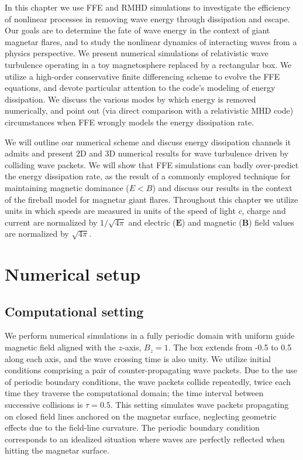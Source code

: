 In this chapter we use FFE and RMHD simulations to investigate the efficiency of nonlinear processes in removing wave energy through dissipation and escape.
Our goals are to determine the fate of wave energy in the context of giant magnetar flares, and to study the nonlinear dynamics of interacting \alfven waves from a physics perspective.
We present numerical simulations of relativistic \alfven wave turbulence operating in a toy magnetosphere replaced by a rectangular box.
We utilize a high-order conservative finite differencing scheme to evolve the FFE equations, and devote particular attention to the code's modeling of energy dissipation. We discuss the various modes by which energy is removed numerically, and point out (via direct comparison with a relativistic MHD code) circumstances when FFE wrongly models the energy dissipation rate.

We will outline our numerical scheme and discuss energy dissipation channels it admits and present 2D and 3D numerical results for \alfven wave turbulence driven by colliding wave packets. 
We will show that FFE simulations can badly over-predict the energy dissipation rate, as the result of a commonly employed technique for maintaining magnetic dominance ($E < B$) and discuss our results in the context of the fireball model for magnetar giant flares. 
Throughout this chapter we utilize units in which speeds are measured in units of the speed of light $c$, charge and current are normalized by $1/\sqrt{4\pi}$ and electric ($\boldsymbol{E}$) and magnetic ($\boldsymbol{B}$) field values are normalized by $\sqrt{4 \pi}$.

\section{Numerical setup}\label{sec:setup}
\subsection{Computational setting}
%
We perform numerical simulations in a fully periodic domain with uniform guide magnetic field aligned with the $z$-axis, $B_z=1$.
The box extends from -0.5 to 0.5 along each axis, and the wave crossing time is also unity.
We utilize initial conditions comprising a pair of counter-propagating \alfven wave packets.
Due to the use of periodic boundary conditions, the wave packets collide repeatedly, twice each time they traverse the computational domain; the time interval between successive collisions is $\tau = 0.5$.
This setting simulates \alfven wave packets propagating on closed field lines anchored on the magnetar surface, neglecting geometric effects due to the field-line curvature. The periodic boundary condition corresponds to an idealized situation where \alfven waves are perfectly reflected when hitting the magnetar surface.

